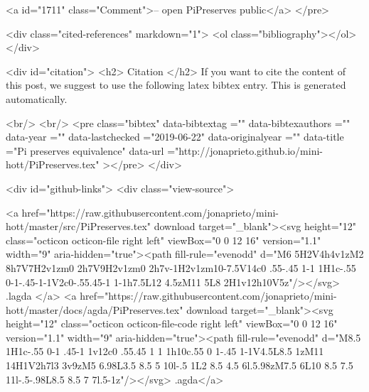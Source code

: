 <a id="1711" class="Comment">-- open PiPreserves public</a>
</pre>


  <div class="cited-references" markdown="1">
  <ol class="bibliography"></ol>
  </div>


  
  <div id="citation">
  <h2> Citation </h2>
  If you want to cite the content of this post,
  we suggest to use the following latex bibtex entry.
  This is generated automatically.

  <br/>
  <br/>
  <pre class="bibtex"
       data-bibtextag =""
       data-bibtexauthors =""
       data-year =""
       data-lastchecked ="2019-06-22"
       data-originalyear =""
       data-title ="Pi preserves equivalence"
       data-url ="http://jonaprieto.github.io/mini-hott/PiPreserves.tex"
  ></pre>
  </div>
  

  <div id="github-links">
    <div class="view-source">
      
        <a href="https://raw.githubusercontent.com/jonaprieto/mini-hott/master/src/PiPreserves.tex" download target="_blank"><svg height="12" class="octicon octicon-file right left" viewBox="0 0 12 16" version="1.1" width="9" aria-hidden="true"><path fill-rule="evenodd" d="M6 5H2V4h4v1zM2 8h7V7H2v1zm0 2h7V9H2v1zm0 2h7v-1H2v1zm10-7.5V14c0 .55-.45 1-1 1H1c-.55 0-1-.45-1-1V2c0-.55.45-1 1-1h7.5L12 4.5zM11 5L8 2H1v12h10V5z"/></svg> .lagda </a>
        <a href="https://raw.githubusercontent.com/jonaprieto/mini-hott/master/docs/agda/PiPreserves.tex" download target="_blank"><svg height="12" class="octicon octicon-file-code right left" viewBox="0 0 12 16" version="1.1" width="9" aria-hidden="true"><path fill-rule="evenodd" d="M8.5 1H1c-.55 0-1 .45-1 1v12c0 .55.45 1 1 1h10c.55 0 1-.45 1-1V4.5L8.5 1zM11 14H1V2h7l3 3v9zM5 6.98L3.5 8.5 5 10l-.5 1L2 8.5 4.5 6l.5.98zM7.5 6L10 8.5 7.5 11l-.5-.98L8.5 8.5 7 7l.5-1z"/></svg> .agda</a>
      
